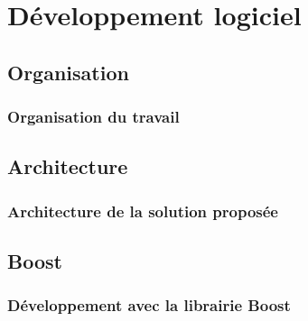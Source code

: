 \section{D\'eveloppement logiciel}

\subsection{Organisation}
\frame
{
\frametitle{Organisation du travail}


}

\subsection{Architecture}
\frame
{
\frametitle{Architecture de la solution propos\'ee}


}

\subsection{Boost}
\frame
{
\frametitle{D\'eveloppement avec la librairie Boost}


}